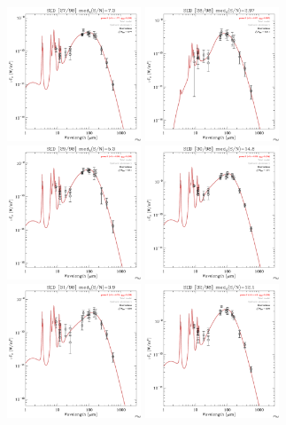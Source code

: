 \documentclass[preprint2,longabstract]{aastex}
\begin{document}
\begin{figure}
    \includegraphics[trim=0 2mm 0 0, clip, width=40mm]{../SEDs/sed_27.pdf}
	\includegraphics[trim=0 2mm 0 0, clip, width=40mm]{../SEDs/sed_28.pdf}
	\includegraphics[trim=0 2mm 0 0, clip, width=40mm]{../SEDs/sed_29.pdf}
	\includegraphics[trim=0 2mm 0 0, clip, width=40mm]{../SEDs/sed_30.pdf}
	\includegraphics[trim=0 2mm 0 0, clip, width=40mm]{../SEDs/sed_31.pdf}
	\includegraphics[trim=0 2mm 0 0, clip, width=40mm]{../SEDs/sed_32.pdf}

\end{figure}
\end{document}
